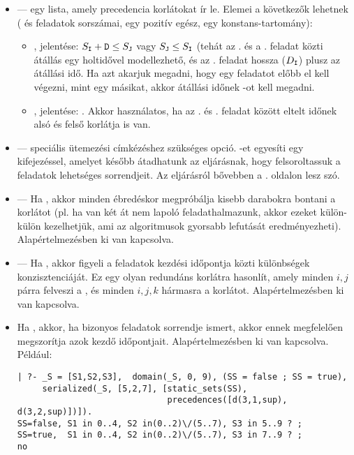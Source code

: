\begin{itemize}
\item {} ---
           egy lista, amely precedencia korlátokat ír le. Elemei a következők
          lehetnek ( és  feladatok sorszámai,  egy pozitív
          egész,  egy  konstans-tartomány):
\begin{itemize}
\item{}, jelentése: $S_{\texttt{I}}+\texttt{D} \leq S_{\texttt{J}}$ vagy $S_{\texttt{J}} \leq S_{\texttt{I}}$
(tehát az . és a . feladat közti átállás egy holtidővel modellezhető, és
 az . feladat hossza ($D_{\texttt{I}}$) plusz az átállási idő. Ha azt akarjuk
megadni, hogy egy feladatot előbb el kell végezni, mint egy másikat, akkor átállási
időnek -ot kell megadni.
\item{}, jelentése: . Akkor használatos, ha az . és . feladat között
eltelt időnek alsó és felső korlátja is van.
\end{itemize}

\item {} --- speciális ütemezési címkézéshez szükséges opció. -et
          egyesíti egy kifejezéssel, amelyet később átadhatunk az 
          eljárásnak, hogy felsoroltassuk a feladatok lehetséges sorrendjeit. Az
           eljárásról bővebben a \pageref{order_resource}. oldalon
          lesz szó.

\item {} ---
          Ha  , akkor minden ébredéskor megpróbálja
          kisebb darabokra bontani a korlátot (pl. ha van két
          át nem lapoló feladathalmazunk, akkor ezeket külön-külön
          kezelhetjük, ami az algoritmusok gyorsabb lefutását
          eredményezheti). Alapértelmezésben ki van kapcsolva.

\item {} ---
          Ha  , akkor figyeli a feladatok kezdési
          időpontja közti különbségek konzisztenciáját. Ez egy olyan redundáns
          korlátra hasonlít, amely minden $i,j$ párra felveszi a
          , és minden $i,j,k$ hármasra a
           korlátot. Alapértelmezésben
          ki van kapcsolva.

\item {}
          Ha  , akkor, ha bizonyos feladatok sorrendje
          ismert, akkor ennek megfelelően megszorítja azok kezdő
          időpontjait. Alapértelmezésben ki van kapcsolva. Például:
\begin{verbatim}
| ?- _S = [S1,S2,S3],  domain(_S, 0, 9), (SS = false ; SS = true),
     serialized(_S, [5,2,7], [static_sets(SS),
                              precedences([d(3,1,sup), d(3,2,sup)])]).
SS=false, S1 in 0..4, S2 in(0..2)\/(5..7), S3 in 5..9 ? ;
SS=true,  S1 in 0..4, S2 in(0..2)\/(5..7), S3 in 7..9 ? ;
no
\end{verbatim}


\end{itemize}
